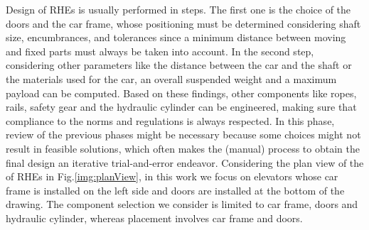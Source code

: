 Design of RHEs is usually performed in steps. The first one is the
choice of the doors and the car frame, whose positioning must be
determined considering shaft size, encumbrances, and tolerances since
a minimum distance between moving and fixed parts must always be taken
into account. In the second step, considering other parameters
like the distance between the car and the shaft or the materials used
for the car, an overall suspended weight and a maximum payload can
be computed. Based on these findings, other components like ropes,
rails, safety gear and the hydraulic cylinder can be engineered,
making sure that compliance to the norms and regulations is always
respected. In this phase, review of the previous phases might be
necessary because some choices might not result in feasible solutions,
which often makes the (manual) process to obtain the final design an
iterative trial-and-error endeavor. 
Considering the plan view of the of RHEs in Fig.\ref{img:planView}, 
in this work we  focus on elevators whose car frame is installed on the
left side and doors are installed at the bottom of the drawing. The
component selection we consider is limited to car frame, doors and
hydraulic cylinder, whereas placement involves car frame and doors.